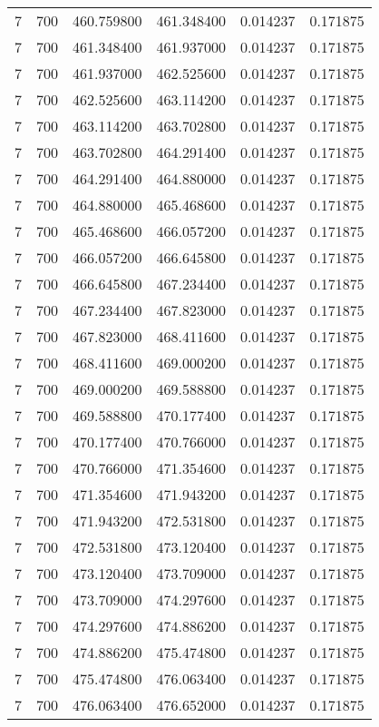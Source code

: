 \begin{longtable}{rrrrrr}
7 & 700 & 460.759800 & 461.348400 & 0.014237 & 0.171875 \\
7 & 700 & 461.348400 & 461.937000 & 0.014237 & 0.171875 \\
7 & 700 & 461.937000 & 462.525600 & 0.014237 & 0.171875 \\
7 & 700 & 462.525600 & 463.114200 & 0.014237 & 0.171875 \\
7 & 700 & 463.114200 & 463.702800 & 0.014237 & 0.171875 \\
7 & 700 & 463.702800 & 464.291400 & 0.014237 & 0.171875 \\
7 & 700 & 464.291400 & 464.880000 & 0.014237 & 0.171875 \\
7 & 700 & 464.880000 & 465.468600 & 0.014237 & 0.171875 \\
7 & 700 & 465.468600 & 466.057200 & 0.014237 & 0.171875 \\
7 & 700 & 466.057200 & 466.645800 & 0.014237 & 0.171875 \\
7 & 700 & 466.645800 & 467.234400 & 0.014237 & 0.171875 \\
7 & 700 & 467.234400 & 467.823000 & 0.014237 & 0.171875 \\
7 & 700 & 467.823000 & 468.411600 & 0.014237 & 0.171875 \\
7 & 700 & 468.411600 & 469.000200 & 0.014237 & 0.171875 \\
7 & 700 & 469.000200 & 469.588800 & 0.014237 & 0.171875 \\
7 & 700 & 469.588800 & 470.177400 & 0.014237 & 0.171875 \\
7 & 700 & 470.177400 & 470.766000 & 0.014237 & 0.171875 \\
7 & 700 & 470.766000 & 471.354600 & 0.014237 & 0.171875 \\
7 & 700 & 471.354600 & 471.943200 & 0.014237 & 0.171875 \\
7 & 700 & 471.943200 & 472.531800 & 0.014237 & 0.171875 \\
7 & 700 & 472.531800 & 473.120400 & 0.014237 & 0.171875 \\
7 & 700 & 473.120400 & 473.709000 & 0.014237 & 0.171875 \\
7 & 700 & 473.709000 & 474.297600 & 0.014237 & 0.171875 \\
7 & 700 & 474.297600 & 474.886200 & 0.014237 & 0.171875 \\
7 & 700 & 474.886200 & 475.474800 & 0.014237 & 0.171875 \\
7 & 700 & 475.474800 & 476.063400 & 0.014237 & 0.171875 \\
7 & 700 & 476.063400 & 476.652000 & 0.014237 & 0.171875 \\

\end{longtable}
